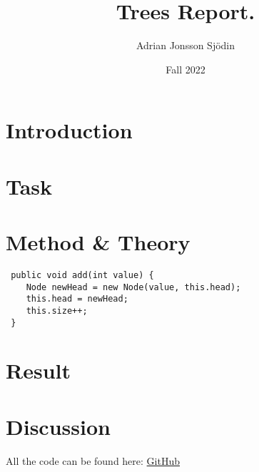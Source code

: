 \documentclass[a4paper,11pt]{article}
\newenvironment{code}{\captionsetup{type=listing}}{}
\begin{document}
\title{
    \textbf{Trees Report.}
}
\author{Adrian Jonsson Sjödin}
\date{Fall 2022}

\maketitle

\section*{Introduction}

\section*{Task}

\section*{Method \& Theory}

\begin{code}
    \label{code:add}
    \begin{verbatim}
 public void add(int value) {
    Node newHead = new Node(value, this.head);
    this.head = newHead;
    this.size++;
 }
\end{verbatim}
\end{code}


\section*{Result}

\section*{Discussion}

All the code can be found here: \href{https://github.com/adrian-jonsson-sjoedin/ID1021-AlgoData/tree/main/Tasks/LinkedLists/src}{GitHub}
\end{document}
